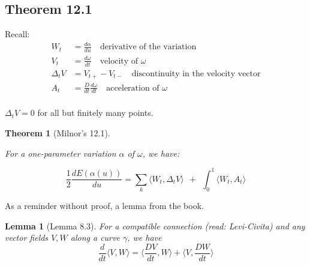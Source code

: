 \documentclass{article}
\newtheorem{thm}{Theorem}
\newtheorem*{lemm*}{Lemma}
\newcommand{\angle}[1]{\langle #1 \rangle}
\begin{document}
\subsection{Theorem 12.1}


Recall:
\[
    \begin{align*}
        W_t &= \frac{d\alpha}{du} \quad\text{derivative of the variation} \\
        V_t &= \frac{d\omega}{dt} \quad\text{velocity of $\omega$} \\
        \Delta_tV &= V_{t+} - V_{t-} \quad\text{discontinuity in the velocity vector} \\
        A_t &= \frac{D}{dt} \frac{d\omega}{dt} \quad\text{acceleration of $\omega$} \\
    \end{align*}
\]

$\Delta_tV = 0$ for all but finitely many points.


\begin{thm}[Milnor's 12.1]
    \label{thm:12.1}

    For a one-parameter variation $\alpha$ of $\omega$, we have:

    \[
        \frac{1}{2} \frac{dE(\alpha(u))}{du} =
        \sum_{k} \angle{ W_t, \Delta_tV } \ \ + \ \ \int_0^1 \angle{ W_t, A_t }
    \]

\end{thm}

As a reminder without proof, a lemma from the book.

\begin{lemm*}[Lemma 8.3]
    For a compatible connection (read: Levi-Civita) and any vector fields $V,W$ along a curve
    $\gamma$, we have
    \[
        \frac{d}{dt}\langle V, W \rangle   =
        \langle \frac{DV}{dt}, W \rangle + \langle V, \frac{DW}{dt} \rangle
    \]
\end{lemm*}
\end{document}
